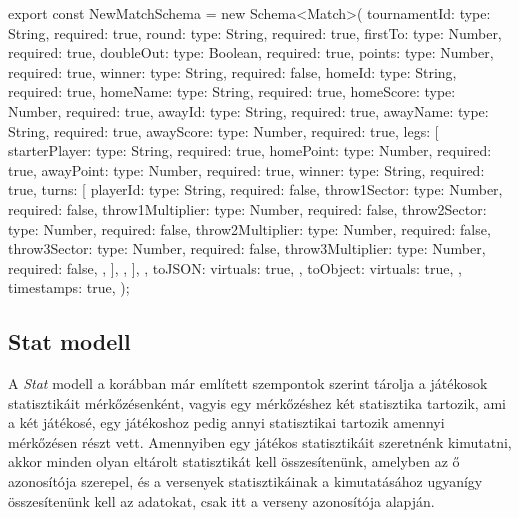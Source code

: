 \begin{cpp}
export const NewMatchSchema = new Schema<Match>(
  {
    tournamentId: {type: String, required: true},
    round: {type: String, required: true},
    firstTo: {type: Number, required: true},
    doubleOut: {type: Boolean, required: true},
    points: {type: Number, required: true},
    winner: {type: String, required: false},
    homeId: {type: String, required: true},
    homeName: {type: String, required: true},
    homeScore: {type: Number, required: true},
    awayId: {type: String, required: true},
    awayName: {type: String, required: true},
    awayScore: {type: Number, required: true},
    legs: [
      {
        starterPlayer: {type: String, required: true},
        homePoint: {type: Number, required: true},
        awayPoint: {type: Number, required: true},
        winner: {type: String, required: true},
        turns: [
          {
            playerId: {type: String, required: false},
            throw1Sector: {type: Number, required: false},
            throw1Multiplier: {type: Number, required: false},
            throw2Sector: {type: Number, required: false},
            throw2Multiplier: {type: Number, required: false},
            throw3Sector: {type: Number, required: false},
            throw3Multiplier: {type: Number, required: false},
          },
        ],
      },
    ],
  },
  {
    toJSON: {
      virtuals: true,
    },
    toObject: {
      virtuals: true,
    },
    timestamps: true,
  }
);
\end{cpp}

\subsection{Stat modell}
A \textit{Stat} modell a korábban már említett szempontok szerint tárolja a játékosok statisztikáit mérkőzésenként, vagyis egy mérkőzéshez két statisztika tartozik, ami a két játékosé, egy játékoshoz pedig annyi statisztikai tartozik amennyi mérkőzésen részt vett. Amennyiben egy játékos statisztikáit szeretnénk kimutatni, akkor minden olyan eltárolt statisztikát kell összesítenünk, amelyben az ő azonosítója szerepel, és a versenyek statisztikáinak a kimutatásához ugyanígy összesítenünk kell az adatokat, csak itt a verseny azonosítója alapján.

